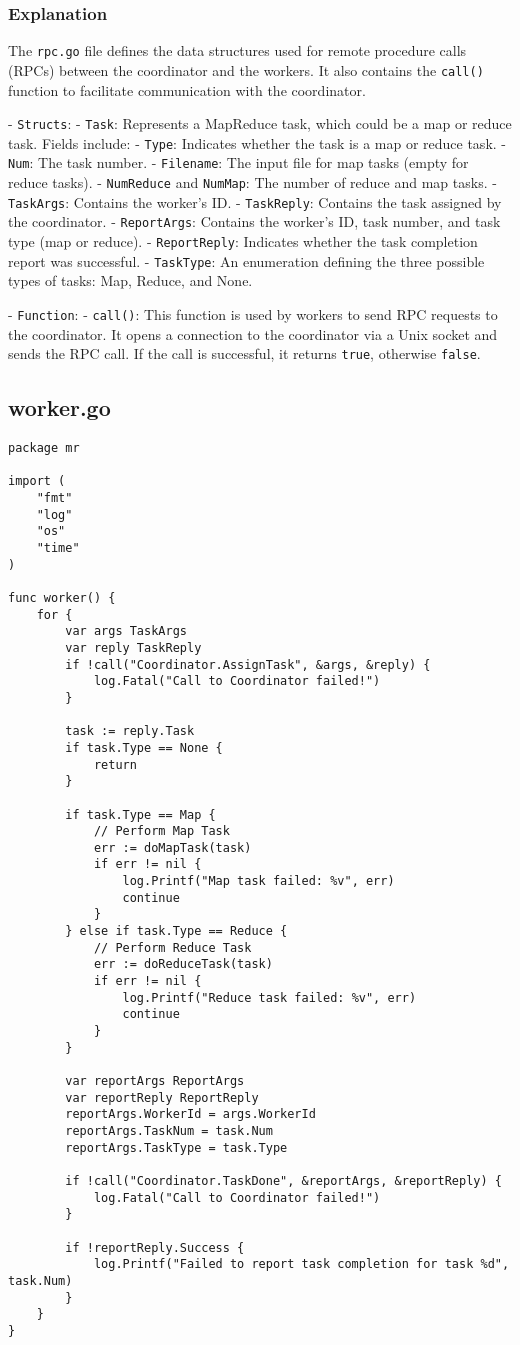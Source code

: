 \documentclass[a4paper,12pt]{article}
\begin{document}
\subsubsection{Explanation}
The \texttt{rpc.go} file defines the data structures used for remote procedure calls (RPCs) between the coordinator and the workers. It also contains the \texttt{call()} function to facilitate communication with the coordinator.

- \texttt{Structs}:
  - \texttt{Task}: Represents a MapReduce task, which could be a map or reduce task. Fields include:
    - \texttt{Type}: Indicates whether the task is a map or reduce task.
    - \texttt{Num}: The task number.
    - \texttt{Filename}: The input file for map tasks (empty for reduce tasks).
    - \texttt{NumReduce} and \texttt{NumMap}: The number of reduce and map tasks.
  - \texttt{TaskArgs}: Contains the worker’s ID.
  - \texttt{TaskReply}: Contains the task assigned by the coordinator.
  - \texttt{ReportArgs}: Contains the worker’s ID, task number, and task type (map or reduce).
  - \texttt{ReportReply}: Indicates whether the task completion report was successful.
  - \texttt{TaskType}: An enumeration defining the three possible types of tasks: Map, Reduce, and None.

- \texttt{Function}:
  - \texttt{call()}: This function is used by workers to send RPC requests to the coordinator. It opens a connection to the coordinator via a Unix socket and sends the RPC call. If the call is successful, it returns \texttt{true}, otherwise \texttt{false}.

\subsection{worker.go}
\begin{lstlisting}
package mr

import (
	"fmt"
	"log"
	"os"
	"time"
)

func worker() {
	for {
		var args TaskArgs
		var reply TaskReply
		if !call("Coordinator.AssignTask", &args, &reply) {
			log.Fatal("Call to Coordinator failed!")
		}

		task := reply.Task
		if task.Type == None {
			return
		}

		if task.Type == Map {
			// Perform Map Task
			err := doMapTask(task)
			if err != nil {
				log.Printf("Map task failed: %v", err)
				continue
			}
		} else if task.Type == Reduce {
			// Perform Reduce Task
			err := doReduceTask(task)
			if err != nil {
				log.Printf("Reduce task failed: %v", err)
				continue
			}
		}

		var reportArgs ReportArgs
		var reportReply ReportReply
		reportArgs.WorkerId = args.WorkerId
		reportArgs.TaskNum = task.Num
		reportArgs.TaskType = task.Type

		if !call("Coordinator.TaskDone", &reportArgs, &reportReply) {
			log.Fatal("Call to Coordinator failed!")
		}

		if !reportReply.Success {
			log.Printf("Failed to report task completion for task %d", task.Num)
		}
	}
}
\end{lstlisting}
\end{document}
